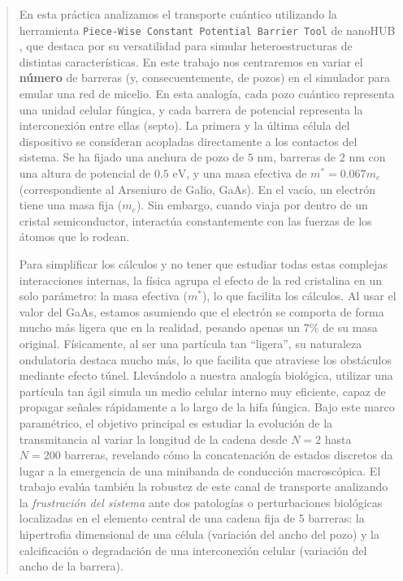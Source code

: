 \documentclass[a4paper,12pt]{article}
\begin{document}
\begin{abstract}
    En esta práctica analizamos el transporte cuántico utilizando la herramienta \texttt{Piece-Wise Constant Potential Barrier Tool} de nanoHUB \cite{nano}, que destaca por su versatilidad para simular heteroestructuras de distintas características. En este trabajo nos centraremos en variar el \textbf{número} de barreras (y, consecuentemente, de pozos) en el simulador para emular una red de micelio. En esta analogía, cada pozo cuántico representa una unidad celular fúngica, y cada barrera de potencial representa la interconexión entre ellas (septo). La primera y la última célula del dispositivo se consideran acopladas directamente a los contactos del sistema.
Se ha fijado una anchura de pozo de $5\text{ nm}$, barreras de $2\text{ nm}$ con una altura de potencial de $0.5\text{ eV}$, y una masa efectiva de $m^* = 0.067 m_e$ (correspondiente al Arseniuro de Galio, GaAs). 
En el vacío, un electrón tiene una masa fija ($m_e$). Sin embargo, cuando viaja por dentro de un cristal semiconductor, interactúa constantemente con las fuerzas de los átomos que lo rodean. 

Para simplificar los cálculos y no tener que estudiar todas estas complejas interacciones internas, la física agrupa el efecto de la red cristalina en un solo parámetro: la masa efectiva ($m^*$), lo que facilita los cálculos. 
Al usar el valor del GaAs, estamos asumiendo que el electrón se comporta de forma mucho más ligera que en la realidad, pesando apenas un $7\%$ de su masa original. Físicamente, al ser una partícula tan ``ligera'', su naturaleza ondulatoria destaca mucho más, lo que facilita que atraviese los obstáculos mediante efecto túnel. Llevándolo a nuestra analogía biológica, utilizar una partícula tan ágil simula un medio celular interno muy eficiente, capaz de propagar señales rápidamente a lo largo de la hifa fúngica. 
Bajo este marco paramétrico, el objetivo principal es estudiar la evolución de la transmitancia al variar la longitud de la cadena desde $N=2$ hasta $N=200$ barreras, revelando cómo la concatenación de estados discretos da lugar a la emergencia de una minibanda de conducción macroscópica.
El trabajo evalúa también la robustez de este canal de transporte analizando la \textit{frustración del sistema} ante dos patologías o perturbaciones biológicas localizadas en el elemento central de una cadena fija de 5 barreras: la hipertrofia dimensional de una célula (variación del ancho del pozo) y la calcificación o degradación de una interconexión celular (variación del ancho de la barrera).

\end{abstract}
\end{document}
